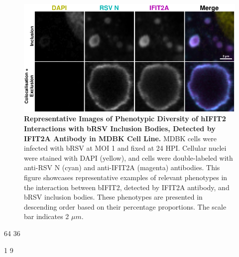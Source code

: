 \begin{figure}
    \centering
    \includegraphics[width=1\linewidth]{08. Chapter 3/Figs/02. Infection/02. IFIT2/01. IFIT2A/15. i2a mdbk brsv.pdf} 
    \caption[Representative Images of Phenotypic Diversity of hIFIT2 Interactions with bRSV Inclusion Bodies, Detected by IFIT2A Antibody in MDBK Cell Line.]{\textbf{Representative Images of Phenotypic Diversity of hIFIT2 Interactions with bRSV Inclusion Bodies, Detected by IFIT2A Antibody in MDBK Cell Line.} MDBK cells were infected with bRSV at MOI 1 and fixed at 24 HPI. Cellular nuclei were stained with DAPI (yellow), and cells were double-labeled with anti-RSV N (cyan) and anti-IFIT2A (magenta) antibodies. This figure showcases representative examples of relevant phenotypes in the interaction between bIFIT2, detected by IFIT2A antibody, and bRSV inclusion bodies. These phenotypes are presented in descending order based on their percentage proportions. The scale bar indicates 2 \(\mu m\).}
    \label{fig:Representative Images of Phenotypic Diversity of hIFIT2 Interactions with bRSV Inclusion Bodies, Detected by IFIT2A Antibody in MDBK Cell Line}
\end{figure}

64 36

1 9

